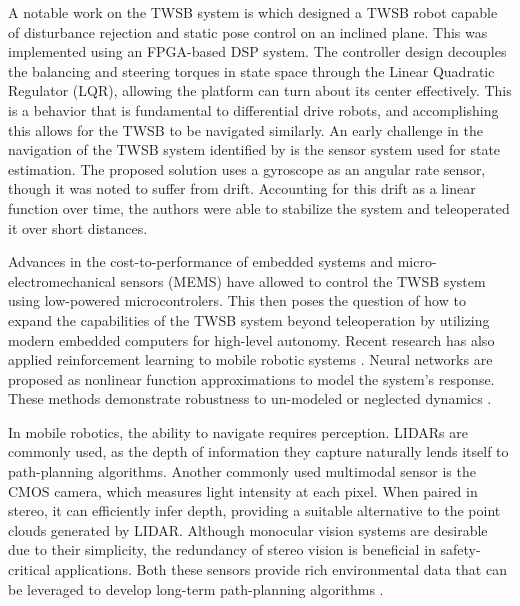     A notable work on the TWSB system is \cite{grasser2002joe} which designed a TWSB robot capable of disturbance
    rejection and static pose control on an inclined plane. This was implemented using an FPGA-based DSP system.
    The controller design decouples the balancing and steering torques in state space through the Linear Quadratic Regulator (LQR), 
    allowing the platform can turn about its center effectively. This is a behavior that is fundamental to differential drive robots, 
    and accomplishing this allows for the TWSB to be navigated similarly.
    An early challenge in the navigation of the TWSB system identified by \cite{SelfContainedMobileTWSB} is the sensor 
    system used for state estimation. The proposed solution uses a gyroscope as an angular rate sensor, though it 
    was noted to suffer from drift. Accounting for this drift as a linear function over time, the authors were able to 
    stabilize the system and teleoperated it over short distances. 

    Advances in the cost-to-performance of embedded systems and micro-electromechanical sensors (MEMS) \cite{MEMS} 
    have allowed \cite{juang2013design} \cite{Velazquez2016VelocityAM} to control the TWSB system 
    using low-powered microcontrolers. This then poses the question of how to expand the capabilities 
    of the TWSB system beyond teleoperation by utilizing modern embedded computers for high-level autonomy. 
    Recent research has also applied reinforcement learning to mobile robotic systems \cite{kober2013reinforcement}.
    Neural networks are proposed as nonlinear function approximations to model the system's response. 
    These methods demonstrate robustness to un-modeled or neglected dynamics \cite{guo2021optimal}.

    In mobile robotics, the ability to navigate requires perception. LIDARs are commonly used, as  
    the depth of information they capture naturally lends itself to path-planning algorithms.
    Another commonly used multimodal sensor is the CMOS camera, which measures light intensity at each pixel. 
    When paired in stereo, it can efficiently infer depth, providing a suitable alternative to the point 
    clouds generated by LIDAR. Although monocular vision systems are desirable due to their simplicity, 
    the redundancy of stereo vision is beneficial in safety-critical applications.
    Both these sensors provide rich environmental data that can be leveraged to develop long-term path-planning algorithms \cite{gonzalez2015review}.


